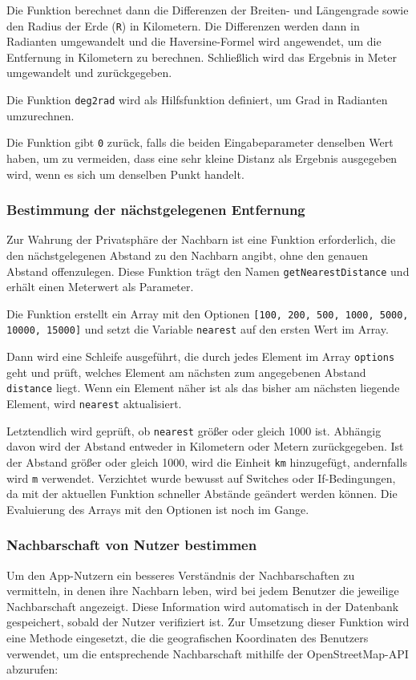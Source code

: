 Die Funktion berechnet dann die Differenzen der Breiten- und Längengrade sowie den Radius der Erde (\texttt{R}) in Kilometern. Die Differenzen werden dann in Radianten umgewandelt und die Haversine-Formel wird angewendet, um die Entfernung in Kilometern zu berechnen. Schließlich wird das Ergebnis in Meter umgewandelt und zurückgegeben.

Die Funktion \texttt{deg2rad} wird als Hilfsfunktion definiert, um Grad in Radianten umzurechnen.

Die Funktion gibt \texttt{0} zurück, falls die beiden Eingabeparameter denselben Wert haben, um zu vermeiden, dass eine sehr kleine Distanz als Ergebnis ausgegeben wird, wenn es sich um denselben Punkt handelt.


\subsubsection{Bestimmung der nächstgelegenen Entfernung}
Zur Wahrung der Privatsphäre der Nachbarn ist eine Funktion erforderlich, die den nächstgelegenen Abstand zu den Nachbarn angibt, ohne den genauen Abstand offenzulegen. Diese Funktion trägt den Namen \texttt{getNearestDistance} und erhält einen Meterwert als Parameter.

Die Funktion erstellt ein Array mit den Optionen \texttt{[100, 200, 500, 1000, 5000, 10000, 15000]} und setzt die Variable \texttt{nearest} auf den ersten Wert im Array.

Dann wird eine Schleife ausgeführt, die durch jedes Element im Array \texttt{options} geht und prüft, welches Element am nächsten zum angegebenen Abstand \texttt{distance} liegt. Wenn ein Element näher ist als das bisher am nächsten liegende Element, wird \texttt{nearest} aktualisiert.

Letztendlich wird geprüft, ob \texttt{nearest} größer oder gleich 1000 ist. Abhängig davon wird der Abstand entweder in Kilometern oder Metern zurückgegeben. Ist der Abstand größer oder gleich 1000, wird die Einheit \texttt{km} hinzugefügt, andernfalls wird \texttt{m} verwendet. Verzichtet wurde bewusst auf Switches oder If-Bedingungen, da mit der aktuellen Funktion schneller Abstände geändert werden können. Die Evaluierung des Arrays mit den Optionen ist noch im Gange.


\subsubsection{Nachbarschaft von Nutzer bestimmen}
Um den App-Nutzern ein besseres Verständnis der Nachbarschaften zu vermitteln, in denen ihre Nachbarn leben, wird bei jedem Benutzer die jeweilige Nachbarschaft angezeigt. Diese Information wird automatisch in der Datenbank gespeichert, sobald der Nutzer verifiziert ist. Zur Umsetzung dieser Funktion wird eine Methode eingesetzt, die die geografischen Koordinaten des Benutzers verwendet, um die entsprechende Nachbarschaft mithilfe der OpenStreetMap-API abzurufen:

